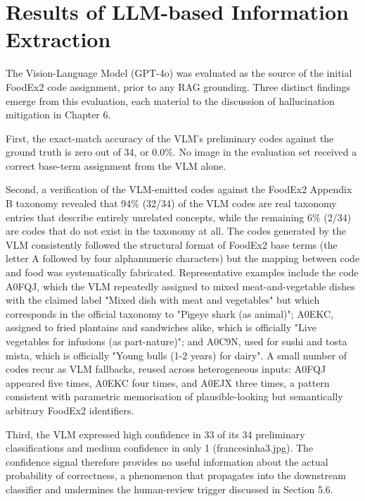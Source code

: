 \hypertarget{results-of-llm-based-information-extraction}{%
\section{Results of LLM-based Information Extraction}\label{results-of-llm-based-information-extraction}}

The Vision-Language Model (GPT-4o) was evaluated as the source of the initial FoodEx2 code assignment, prior to any RAG grounding. Three distinct findings emerge from this evaluation, each material to the discussion of hallucination mitigation in Chapter 6.

First, the exact-match accuracy of the VLM's preliminary codes against the ground truth is zero out of 34, or 0.0\%. No image in the evaluation set received a correct base-term assignment from the VLM alone.

Second, a verification of the VLM-emitted codes against the FoodEx2 Appendix B taxonomy revealed that 94\% (32/34) of the VLM codes are real taxonomy entries that describe entirely unrelated concepts, while the remaining 6\% (2/34) are codes that do not exist in the taxonomy at all. The codes generated by the VLM consistently followed the structural format of FoodEx2 base terms (the letter A followed by four alphanumeric characters) but the mapping between code and food was systematically fabricated. Representative examples include the code A0FQJ, which the VLM repeatedly assigned to mixed meat-and-vegetable dishes with the claimed label "Mixed dish with meat and vegetables" but which corresponds in the official taxonomy to "Pigeye shark (as animal)"; A0EKC, assigned to fried plantains and sandwiches alike, which is officially "Live vegetables for infusions (as part-nature)"; and A0C9N, used for sushi and tosta mista, which is officially "Young bulls (1-2 years) for dairy". A small number of codes recur as VLM fallbacks, reused across heterogeneous inputs: A0FQJ appeared five times, A0EKC four times, and A0EJX three times, a pattern consistent with parametric memorisation of plausible-looking but semantically arbitrary FoodEx2 identifiers.

Third, the VLM expressed high confidence in 33 of its 34 preliminary classifications and medium confidence in only 1 (francesinha3.jpg). The confidence signal therefore provides no useful information about the actual probability of correctness, a phenomenon that propagates into the downstream classifier and undermines the human-review trigger discussed in Section 5.6.

